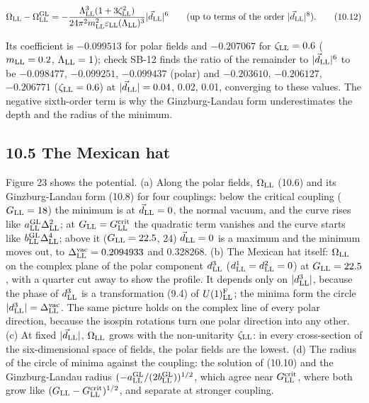 \documentclass[
  10pt,
]{article}
\begin{document}
\[\Omega_{\rm LL}-\Omega^{\rm GL}_{\rm LL}=-\frac{\Lambda_{\rm LL}^3(1+3\zeta_{\rm LL}^2)}{24\pi^2m_{\rm LL}^2\varepsilon_{\rm LL}(\Lambda_{\rm LL})^3}\lvert\vec d_{\rm LL}\rvert^6\qquad\text{(up to terms of the order }\lvert\vec d_{\rm LL}\rvert^8).\tag{10.12}\]

Its coefficient is \(-0.099513\) for polar fields and \(-0.207067\) for
\(\zeta_{\rm LL}=0.6\) (\(m_{\rm LL}=0.2\), \(\Lambda_{\rm LL}=1\));
check SB-12 finds the ratio of the remainder to
\(\lvert\vec d_{\rm LL}\rvert^6\) to be \(-0.098477\), \(-0.099251\),
\(-0.099437\) (polar) and \(-0.203610\), \(-0.206127\), \(-0.206771\)
(\(\zeta_{\rm LL}=0.6\)) at \(\lvert\vec d_{\rm LL}\rvert=0.04\), 0.02,
0.01, converging to these values. The negative sixth-order term is why
the Ginzburg-Landau form underestimates the depth and the radius of the
minimum.

\hypertarget{the-mexican-hat}{%
\subsection{10.5 The Mexican hat}\label{the-mexican-hat}}

Figure 23 shows the potential. (a) Along the polar fields,
\(\Omega_{\rm LL}\) (10.6) and its Ginzburg-Landau form (10.8) for four
couplings: below the critical coupling (\(G_{\rm LL}=18\)) the minimum
is at \(\vec d_{\rm LL}=0\), the normal vacuum, and the curve rises like
\(a^{\rm GL}_{\rm LL}\Delta_{\rm LL}^2\); at
\(G_{\rm LL}=G^{\rm crit}_{\rm LL}\) the quadratic term vanishes and the
curve starts like \(b^{\rm GL}_{\rm LL}\Delta_{\rm LL}^4\); above it
(\(G_{\rm LL}=22.5\), 24) \(\vec d_{\rm LL}=0\) is a maximum and the
minimum moves out, to \(\Delta^{\rm vac}_{\rm LL}=0.2094933\) and
0.328268. (b) The Mexican hat itself: \(\Omega_{\rm LL}\) on the complex
plane of the polar component \(d^3_{\rm LL}\)
(\(d^1_{\rm LL}=d^2_{\rm LL}=0\)) at \(G_{\rm LL}=22.5\), with a quarter
cut away to show the profile. It depends only on
\(\lvert d^3_{\rm LL}\rvert\), because the phase of \(d^3_{\rm LL}\) is
a transformation (9.4) of \(U(1)^{\rm F}_{\rm LL}\); the minima form the
circle \(\lvert d^3_{\rm LL}\rvert=\Delta^{\rm vac}_{\rm LL}\). The same
picture holds on the complex line of every polar direction, because the
isospin rotations turn one polar direction into any other. (c) At fixed
\(\lvert\vec d_{\rm LL}\rvert\), \(\Omega_{\rm LL}\) grows with the
non-unitarity \(\zeta_{\rm LL}\): in every cross-section of the
six-dimensional space of fields, the polar fields are the lowest. (d)
The radius of the circle of minima against the coupling: the solution of
(10.10) and the Ginzburg-Landau radius
\((-a^{\rm GL}_{\rm LL}/(2b^{\rm GL}_{\rm LL}))^{1/2}\), which agree
near \(G^{\rm crit}_{\rm LL}\), where both grow like
\((G_{\rm LL}-G^{\rm crit}_{\rm LL})^{1/2}\), and separate at stronger
coupling.
\end{document}
